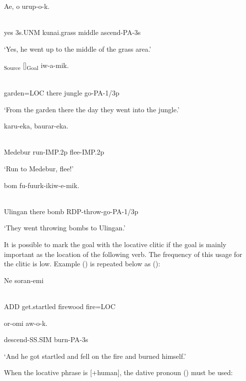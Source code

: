\ea%
\label{ex:x860}
\gll Ae,  o    urup-o-k. \\
      \\
\glt
\z

yes  3s.UNM  kunai.grass  middle  ascend-PA-3s

`Yes, he went up to the middle of the  grass area.'

\ea%
\label{ex:x861}
\gll [Manina=pa  nan]\textsubscript{Source}  []\textsubscript{Goal}  iw-a-mik. \\
      \\
\glt
\z

garden=LOC  there  jungle  go-PA-1/3p

`From the garden there the day they went into the jungle.'

\ea%
\label{ex:x862}
\gll {}  karu-eka,  baurar-eka. \\
      \\
\glt
\z

Medebur  run-IMP.2p  flee-IMP.2p

`Run to Medebur, flee!'

\ea%
\label{ex:x863}
\gll {}  bom  fu-fuurk-ikiw-e-mik. \\
      \\
\glt
\z

Ulingan  there  bomb  RDP-throw-go-PA-1/3p

`They went throwing bombs to Ulingan.'

It is possible to mark the goal with the locative clitic if the goal is mainly important as the location of the following verb. The frequency of this usage for the clitic is low. Example () is repeated below as (): 

\ea%
\label{ex:x1884}
\gll Ne  soran-emi   \\
      \\
\glt
\z

ADD  get.startled  firewood  fire=LOC

or-omi  aw-o-k.

descend-SS.SIM  burn-PA-3s

`And he got startled and fell on the fire and burned himself.'

When the locative phrase is [+human], the dative pronoun () must be used:

